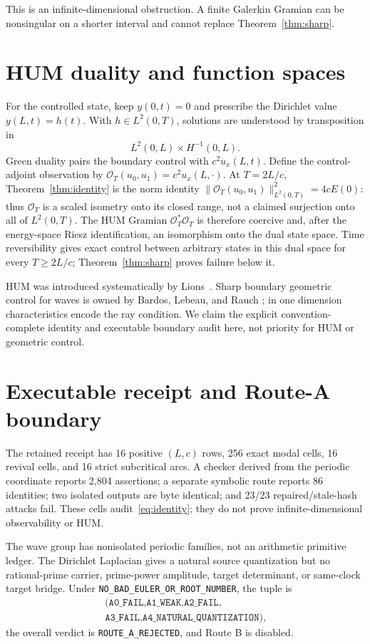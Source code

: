 \documentclass[10pt]{article}
\begin{document}
This is an infinite-dimensional obstruction.  A finite Galerkin Gramian can
be nonsingular on a shorter interval and cannot replace Theorem~\ref{thm:sharp}.

\section{HUM duality and function spaces}
For the controlled state, keep $y(0,t)=0$ and prescribe the Dirichlet value
$y(L,t)=h(t)$.  With $h\in L^2(0,T)$, solutions are understood by
transposition in
\[
 L^2(0,L)\times H^{-1}(0,L).
\]
Green duality pairs the boundary control with $c^2u_x(L,t)$.  Define the
control-adjoint observation by
$\mathcal O_T(u_0,u_1)=c^2u_x(L,\cdot)$.  At $T=2L/c$,
Theorem~\ref{thm:identity} is the norm identity
$\|\mathcal O_T(u_0,u_1)\|_{L^2(0,T)}^2=4cE(0)$: thus
$\mathcal O_T$ is a scaled isometry onto its closed range, not a claimed
surjection onto all of $L^2(0,T)$.  The HUM Gramian
$\mathcal O_T^*\mathcal O_T$ is therefore coercive and, after the energy-space
Riesz identification, an isomorphism onto the dual state space.  Time
reversibility gives exact control between arbitrary states in this dual space
for every $T\ge2L/c$; Theorem~\ref{thm:sharp} proves failure below it.

HUM was introduced systematically by Lions~\cite{Lions1988}.  Sharp boundary
geometric control for waves is owned by Bardos, Lebeau, and Rauch
\cite{BLR1992}; in one dimension characteristics encode the ray condition.
We claim the explicit convention-complete identity and executable boundary
audit here, not priority for HUM or geometric control.

\section{Executable receipt and Route-A boundary}
The retained receipt has 16 positive $(L,c)$ rows, 256 exact modal cells,
16 revival cells, and 16 strict subcritical arcs.  A checker derived from the
periodic coordinate reports 2,804 assertions; a separate symbolic route
reports 86 identities; two isolated outputs are byte identical; and 23/23
repaired/stale-hash attacks fail.  These cells audit~\eqref{eq:identity}; they
do not prove infinite-dimensional observability or HUM.

The wave group has nonisolated periodic families, not an arithmetic primitive
ledger.  The Dirichlet Laplacian gives a natural source quantization but no
rational-prime carrier, prime-power amplitude, target determinant, or
same-clock target bridge.  Under
\texttt{NO\_BAD\_EULER\_OR\_ROOT\_NUMBER}, the tuple is
\[
 \begin{gathered}
 \texttt{(A0\_FAIL,A1\_WEAK,A2\_FAIL,}\\[-2pt]
 \texttt{A3\_FAIL,A4\_NATURAL\_QUANTIZATION)},
 \end{gathered}
\]
the overall verdict is \texttt{ROUTE\_A\_REJECTED}, and Route B is disabled.
\fi
\end{document}
